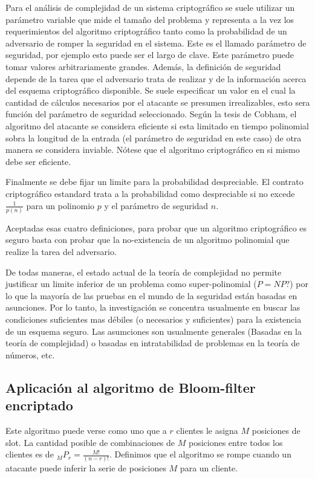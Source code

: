 Para el análisis de complejidad de un sistema criptográfico se suele utilizar un parámetro variable que mide el tamaño del problema y representa a la vez los requerimientos del algoritmo criptográfico tanto como la probabilidad de un adversario de romper la seguridad en el sistema. Este es el llamado parámetro de seguridad, por ejemplo esto puede ser el largo de clave.
Este parámetro puede tomar valores arbitrariamente grandes.
Además, la definición de seguridad depende de la tarea que el adversario trata de realizar y de la información acerca del esquema criptográfico disponible.
Se suele especificar un valor en el cual la cantidad de cálculos necesarios por el atacante se presumen irrealizables, esto sera función del parámetro de seguridad seleccionado.
Según la tesis de Cobham\cite{citeulike:6647003}, el algoritmo del atacante se considera eficiente si esta limitado en tiempo polinomial sobra la longitud de la entrada (el parámetro de seguridad en este caso) de otra manera se considera inviable. Nótese que el algoritmo criptográfico en si mismo debe ser eficiente.

Finalmente se debe fijar un limite para la probabilidad despreciable. El contrato criptográfico estandard trata a la probabilidad como despreciable si no excede $\frac{1}{p(n)}$  para un polinomio $p$ y el parámetro de seguridad $n$.

Aceptadas esas cuatro definiciones, para probar que un algoritmo criptográfico es seguro basta con probar que la no-existencia de un algoritmo polinomial que realize la tarea del adversario.

De todas maneras, el estado actual de la teoría de complejidad no permite justificar un limite inferior de un problema como super-polinomial ($P=NP?$) por lo que la mayoría de las pruebas en el mundo de la seguridad están basadas en asunciones.
Por lo tanto, la investigación se concentra usualmente en buscar las condiciones suficientes mas débiles (o necesarios y suficientes) para la existencia de un esquema seguro.
Las asumciones son usualmente generales (Basadas en la teoría de complejidad) o basadas en intratabilidad de problemas en la teoría de números, etc.

\subsection{Aplicación al algoritmo de Bloom-filter encriptado}

Este algoritmo puede verse como uno que a $r$ clientes le asigna $M$ posiciones de slot.
La cantidad posible de combinaciones de $M$ posiciones entre todos los clientes es de $ _{M}P_{r} = \frac{M!}{(n-r)!} $.
Definimos que el algoritmo se rompe cuando un atacante puede inferir la serie de posiciones $M$ para un cliente.

